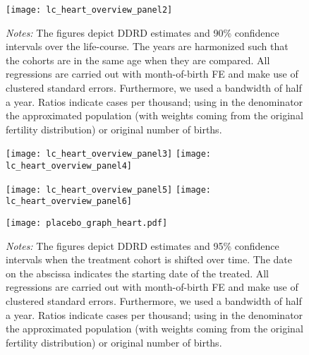 \begin{landscape}
\begin{figure}[H]
\centering
\begin{minipage}{.9\linewidth}
\texttt{[image: lc\_heart\_overview\_panel2]}
{\scriptsize \emph{Notes:} The figures depict DDRD estimates and 90\% confidence intervals over the life-course. The years are harmonized such that the cohorts are in the same age when they are compared. All regressions are carried out with month-of-birth FE and make use of clustered standard errors. Furthermore, we used a bandwidth of half a year. Ratios indicate cases per thousand; using in the denominator the approximated population (with weights coming from the original fertility distribution) or original number of births. \par}
\end{minipage}
\end{figure}
\end{landscape}
\begin{figure}[H]%
	\centering
	\texttt{[image: lc\_heart\_overview\_panel3]}
	\texttt{[image: lc\_heart\_overview\_panel4]}
\end{figure}
\begin{figure}[H]
	\centering	
	\texttt{[image: lc\_heart\_overview\_panel5]}
	\texttt{[image: lc\_heart\_overview\_panel6]}
\end{figure}

\newpage
\begin{landscape}
\begin{figure}[H]
	\centering
    \begin{minipage}{.9\linewidth}
	\texttt{[image: placebo\_graph\_heart.pdf]}
    {\scriptsize \emph{Notes:} The figures depict DDRD estimates and 95\% confidence intervals when the treatment cohort is shifted over time. The date on the abscissa indicates the starting date of the treated.  All regressions are carried out with month-of-birth FE and make use of clustered standard errors. Furthermore, we used a bandwidth of half a year. Ratios indicate cases per thousand; using in the denominator the approximated population (with weights coming from the original fertility distribution) or original number of births. \par}
    \end{minipage}
\end{figure}
\end{landscape}
